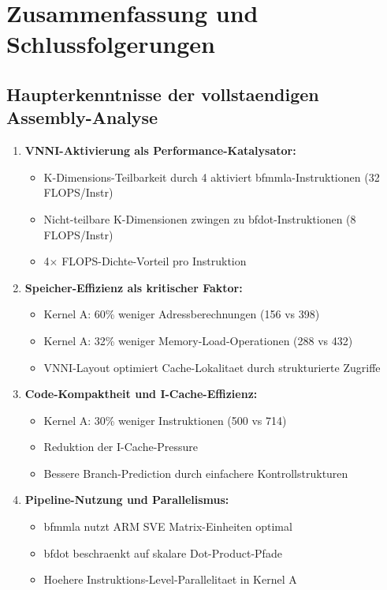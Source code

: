 \documentclass[11pt,a4paper]{article}
\begin{document}
\section{Zusammenfassung und Schlussfolgerungen}

\subsection{Haupterkenntnisse der vollstaendigen Assembly-Analyse}

\begin{enumerate}
\item \textbf{VNNI-Aktivierung als Performance-Katalysator:} 
   \begin{itemize}
   \item K-Dimensions-Teilbarkeit durch 4 aktiviert bfmmla-Instruktionen (32 FLOPS/Instr)
   \item Nicht-teilbare K-Dimensionen zwingen zu bfdot-Instruktionen (8 FLOPS/Instr)
   \item 4$\times$ FLOPS-Dichte-Vorteil pro Instruktion
   \end{itemize}

\item \textbf{Speicher-Effizienz als kritischer Faktor:}
   \begin{itemize}
   \item Kernel A: 60\% weniger Adressberechnungen (156 vs 398)
   \item Kernel A: 32\% weniger Memory-Load-Operationen (288 vs 432)
   \item VNNI-Layout optimiert Cache-Lokalitaet durch strukturierte Zugriffe
   \end{itemize}

\item \textbf{Code-Kompaktheit und I-Cache-Effizienz:}
   \begin{itemize}
   \item Kernel A: 30\% weniger Instruktionen (500 vs 714)
   \item Reduktion der I-Cache-Pressure
   \item Bessere Branch-Prediction durch einfachere Kontrollstrukturen
   \end{itemize}

\item \textbf{Pipeline-Nutzung und Parallelismus:}
   \begin{itemize}
   \item bfmmla nutzt ARM SVE Matrix-Einheiten optimal
   \item bfdot beschraenkt auf skalare Dot-Product-Pfade  
   \item Hoehere Instruktions-Level-Parallelitaet in Kernel A
   \end{itemize}


\end{enumerate}
\end{document}
